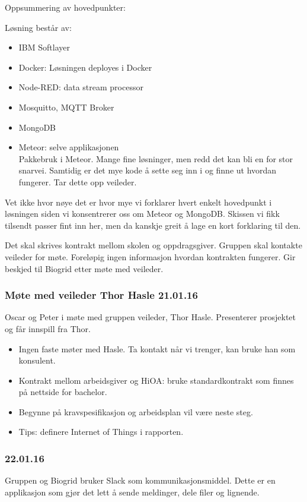 \documentclass[12pt, oneside]{article}
\begin{document}
Oppsummering av hovedpunkter:

Løsning består av:
\begin{itemize}
	\item IBM Softlayer
	\item Docker: Løsningen deployes i Docker
	\item Node-RED: data stream processor
	\item Mosquitto, MQTT Broker
	\item MongoDB
	\item Meteor: selve applikasjonen\\
	Pakkebruk i Meteor. Mange fine løsninger, men redd det kan bli en for stor snarvei. Samtidig er det mye kode å sette seg inn i og finne ut hvordan 	fungerer. Tar dette opp veileder. 
\end{itemize}
Vet ikke hvor nøye det er hvor mye vi forklarer hvert enkelt hovedpunkt i løsningen siden vi konsentrerer oss om Meteor og MongoDB. Skissen vi fikk tilsendt passer fint inn her, men da kanskje greit å lage en kort forklaring til den.

Det skal skrives kontrakt mellom skolen og oppdragsgiver. Gruppen skal kontakte veileder for møte. Foreløpig ingen informasjon hvordan kontrakten fungerer. Gir beskjed til Biogrid etter møte med veileder. 


\subsubsection{Møte med veileder Thor Hasle 21.01.16}
Oscar og Peter i møte med gruppen veileder, Thor Hasle. Presenterer prosjektet og får innspill fra Thor.
\begin{itemize}
	\item  Ingen faste møter med Hasle. Ta kontakt når vi trenger, kan bruke han som konsulent.
	\item  Kontrakt mellom arbeidsgiver og HiOA: bruke standardkontrakt som finnes på nettside for bachelor.
	\item  Begynne på kravspesifikasjon og arbeidsplan vil være neste steg.
	\item  Tips: definere Internet of Things i rapporten.
\end{itemize}

\subsubsection{22.01.16}
Gruppen og Biogrid bruker Slack som kommunikasjonsmiddel. Dette er en applikasjon som gjør det lett å sende meldinger, dele filer og lignende.
\end{document}
